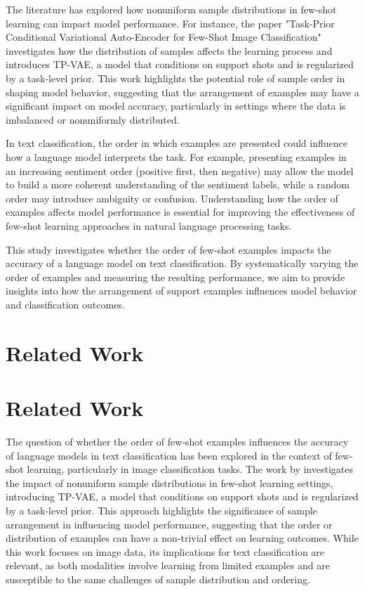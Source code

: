 \documentclass{article}
\begin{document}
The literature has explored how nonuniform sample distributions in few-shot learning can impact model performance. For instance, the paper "Task-Prior Conditional Variational Auto-Encoder for Few-Shot Image Classification" \cite{2205.15014v1} investigates how the distribution of samples affects the learning process and introduces TP-VAE, a model that conditions on support shots and is regularized by a task-level prior. This work highlights the potential role of sample order in shaping model behavior, suggesting that the arrangement of examples may have a significant impact on model accuracy, particularly in settings where the data is imbalanced or nonuniformly distributed.

In text classification, the order in which examples are presented could influence how a language model interprets the task. For example, presenting examples in an increasing sentiment order (positive first, then negative) may allow the model to build a more coherent understanding of the sentiment labels, while a random order may introduce ambiguity or confusion. Understanding how the order of examples affects model performance is essential for improving the effectiveness of few-shot learning approaches in natural language processing tasks.

This study investigates whether the order of few-shot examples impacts the accuracy of a language model on text classification. By systematically varying the order of examples and measuring the resulting performance, we aim to provide insights into how the arrangement of support examples influences model behavior and classification outcomes.
\section{Related Work}
\section*{Related Work}

The question of whether the order of few-shot examples influences the accuracy of language models in text classification has been explored in the context of few-shot learning, particularly in image classification tasks. The work by \cite{2205.15014v1} investigates the impact of nonuniform sample distributions in few-shot learning settings, introducing TP-VAE, a model that conditions on support shots and is regularized by a task-level prior. This approach highlights the significance of sample arrangement in influencing model performance, suggesting that the order or distribution of examples can have a non-trivial effect on learning outcomes. While this work focuses on image data, its implications for text classification are relevant, as both modalities involve learning from limited examples and are susceptible to the same challenges of sample distribution and ordering.
\end{document}
